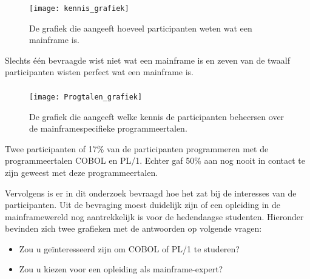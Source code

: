 \subsubsection{}
\label{sec:Weet u wat een mainframe is?}

 \begin{figure}[h]
    \centering
    \texttt{[image: kennis\_grafiek]}
    \caption{De grafiek die aangeeft hoeveel participanten weten wat een mainframe is.}
\end{figure}

Slechts één bevraagde wist niet wat een mainframe is en zeven van de twaalf participanten wisten perfect wat een mainframe is. 

\newpage

\subsubsection{}
\label{sec:Heeft u ervaring of bent u al in contact geweest met de programmeertalen COBOL of PL/1?}

 \begin{figure}[h]
    \centering
    \texttt{[image: Progtalen\_grafiek]}
    \caption{De grafiek  die aangeeft welke kennis de participanten beheersen over de mainframespecifieke programmeertalen.}
\end{figure}

Twee participanten of 17\% van de participanten programmeren met de programmeertalen COBOL en PL/1. Echter gaf 50\% aan nog nooit in contact te zijn geweest met deze programmeertalen. 

Vervolgens is er in dit onderzoek bevraagd hoe het zat bij de interesses van de participanten. Uit de bevraging moest duidelijk zijn of een opleiding in de mainframewereld nog aantrekkelijk is voor de hedendaagse studenten. Hieronder bevinden zich twee grafieken met de antwoorden op volgende vragen:
  \begin{itemize}
    \item Zou u geïnteresseerd zijn om COBOL of PL/1 te studeren?
    \item Zou u kiezen voor een opleiding als mainframe-expert?
\end{itemize}

